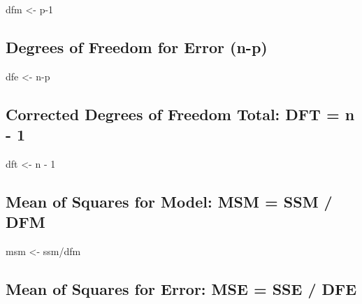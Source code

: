 \documentclass[
]{article}
\newenvironment{Shaded}{\begin{snugshade}}{\end{snugshade}}
\newcommand{\DecValTok}[1]{\textcolor[rgb]{0.00,0.00,0.81}{#1}}
\newcommand{\NormalTok}[1]{#1}
\newcommand{\OtherTok}[1]{\textcolor[rgb]{0.56,0.35,0.01}{#1}}
\newcommand{\SpecialCharTok}[1]{\textcolor[rgb]{0.00,0.00,0.00}{#1}}
\begin{document}
\begin{Shaded}
\begin{Highlighting}[]
\NormalTok{dfm }\OtherTok{\textless{}{-}}\NormalTok{ p}\DecValTok{{-}1}
\end{Highlighting}
\end{Shaded}

\hypertarget{degrees-of-freedom-for-error-n-p}{%
\subsection{Degrees of Freedom for Error
(n-p)}\label{degrees-of-freedom-for-error-n-p}}

\begin{Shaded}
\begin{Highlighting}[]
\NormalTok{dfe }\OtherTok{\textless{}{-}}\NormalTok{ n}\SpecialCharTok{{-}}\NormalTok{p}
\end{Highlighting}
\end{Shaded}

\hypertarget{corrected-degrees-of-freedom-total-dft-n---1}{%
\subsection{Corrected Degrees of Freedom Total: DFT = n -
1}\label{corrected-degrees-of-freedom-total-dft-n---1}}

\begin{Shaded}
\begin{Highlighting}[]
\NormalTok{dft }\OtherTok{\textless{}{-}}\NormalTok{ n }\SpecialCharTok{{-}} \DecValTok{1}
\end{Highlighting}
\end{Shaded}

\hypertarget{mean-of-squares-for-model-msm-ssm-dfm}{%
\subsection{Mean of Squares for Model: MSM = SSM /
DFM}\label{mean-of-squares-for-model-msm-ssm-dfm}}

\begin{Shaded}
\begin{Highlighting}[]
\NormalTok{msm }\OtherTok{\textless{}{-}}\NormalTok{ ssm}\SpecialCharTok{/}\NormalTok{dfm}
\end{Highlighting}
\end{Shaded}

\hypertarget{mean-of-squares-for-error-mse-sse-dfe}{%
\subsection{Mean of Squares for Error: MSE = SSE /
DFE}\label{mean-of-squares-for-error-mse-sse-dfe}}
\end{document}
